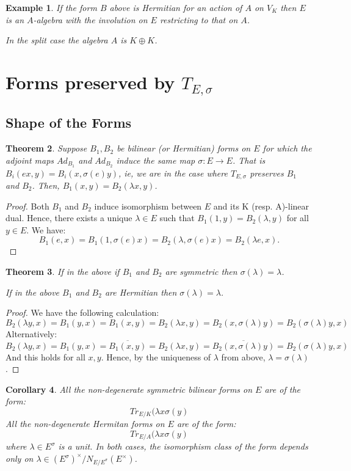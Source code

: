 \documentclass{article}
\theoremstyle{plain}
\newtheorem{theorem}{Theorem}[section]
\newtheorem{corollary}[theorem]{Corollary}
\newtheorem{example}[theorem]{Example}
\theoremstyle{definition}
\begin{document}
\begin{example}
If the form $B$ above is Hermitian for an action of $A$ on $V_K$ then $E$ is an $A$-algebra with the involution on $E$ restricting to that on $A$.

In the split case the algebra $A$ is $K\oplus K$.
\end{example}

\section{Forms preserved by $T_{E,\sigma}$}

\subsection{Shape of the Forms}

\begin{theorem}
Suppose $B_1,B_2$ be bilinear (or Hermitian) forms on $E$ for which the adjoint maps $Ad_{B_1}$ and $Ad_{B_2}$ induce the same map $\sigma:E\rightarrow E$.
That is $B_i(ex,y) = B_i(x,\sigma(e)y)$, ie, we are in the case where $T_{E,\sigma}$ preserves $B_1$ and $B_2$.
Then, $B_1(x,y) = B_2(\lambda x,y)$.
\end{theorem}
\begin{proof}
Both $B_1$ and $B_2$ induce isomorphism between $E$ and its K (resp. A)-linear dual.
Hence, there exists a unique $\lambda\in E$ such that $B_1(1,y) = B_2(\lambda,y)$ for all $y\in E$.
We have:
\[ B_1(e,x) = B_1(1,\sigma(e)x) = B_2(\lambda,\sigma(e)x) = B_2(\lambda e,x). \]
\end{proof}
\begin{theorem}
If in the above if $B_1$ and $B_2$ are symmetric then $\sigma(\lambda)=\lambda$.

If in the above $B_1$ and $B_2$ are Hermitian then $\sigma(\lambda)=\lambda$.
\end{theorem}
\begin{proof}
We have the following calculation:
\[ B_2(\lambda y,x) = B_1(y,x) = B_1(x,y) = B_2(\lambda x,y) = B_2(x,\sigma(\lambda) y) = B_2(\sigma(\lambda)y,x) \]
Alternatively:
\[ B_2(\lambda y,x) = B_1(y,x) = \overline{B_1(x,y)} = B_2(\lambda x,y) = \overline{B_2(x,\sigma(\lambda) y)} = B_2(\sigma(\lambda)y,x) \]
And this holds for all $x,y$.
Hence, by the uniqueness of $\lambda$ from above, $\lambda=\sigma(\lambda)$.
\end{proof}
\begin{corollary}
All the non-degenerate symmetric bilinear forms on $E$ are of the form:
\[ Tr_{E/K}(\lambda x\sigma(y) \]
All the non-degenerate Hermitan forms on $E$ are of the form:
\[ Tr_{E/A}(\lambda x\sigma(y) \]
where $\lambda \in E^\sigma$ is a unit.
In both cases, the isomorphism class of the form depends only on $\lambda \in (E^\sigma)^\times/N_{E/E^\sigma}(E^\times)$.
\end{corollary}
\end{document}
